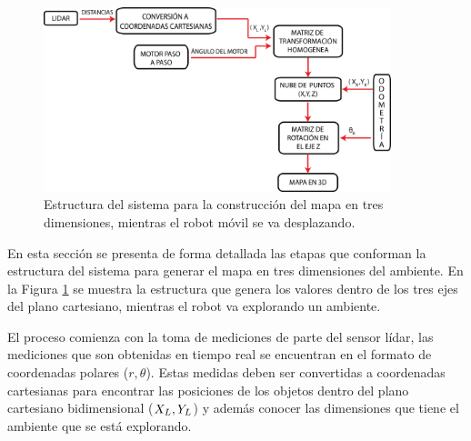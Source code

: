 \begin{figure}%
	\centering \footnotesize
	\includegraphics[width=0.9\textwidth]{images/estructura_3D_1.png}
	\captionsetup{font=footnotesize}
	\caption{Estructura del sistema para la construcción del mapa en tres dimensiones, mientras 
	el robot móvil se va desplazando.}
	\label{fig:Sist3D}
\end{figure}

En esta sección se presenta de forma detallada las etapas que conforman la estructura
del sistema para generar el mapa en tres dimensiones del ambiente. En la Figura \ref{fig:Sist3D} se 
muestra la estructura que genera los valores dentro de los tres ejes del plano cartesiano, mientras
el robot va explorando un ambiente.

El proceso comienza con la toma de mediciones de parte del sensor lídar, las mediciones que son 
obtenidas en tiempo real se encuentran en el formato de coordenadas polares ($r,\theta$). Estas 
medidas deben ser convertidas a coordenadas cartesianas para encontrar las posiciones de los
objetos dentro del plano cartesiano bidimensional ($\mathnormal X_{L}, \mathnormal Y_{L}$) y además conocer
las dimensiones que tiene el ambiente que se está explorando.


